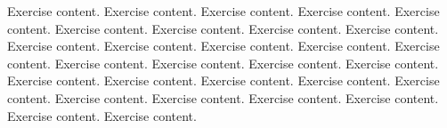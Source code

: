 \begin{exer}
Exercise content. Exercise content. Exercise content. Exercise content. Exercise content. Exercise content. Exercise content. Exercise content. Exercise content. Exercise content.  Exercise content. Exercise content. Exercise content. Exercise content. Exercise content. Exercise content. Exercise content. Exercise content. Exercise content. Exercise content. Exercise content. Exercise content. Exercise content. Exercise content. Exercise content. Exercise content. Exercise content. Exercise content. Exercise content.

\end{exer}

\egroup

